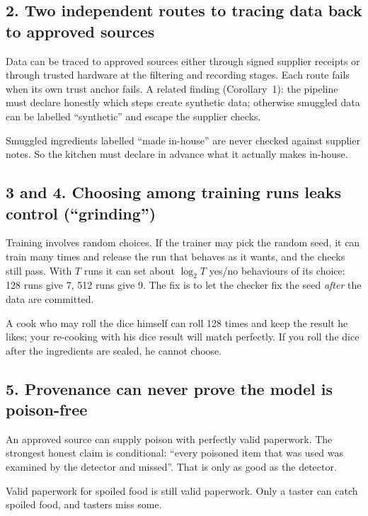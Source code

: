 \subsection*{2. Two independent routes to tracing data back to approved sources}
Data can be traced to approved sources either through signed supplier receipts or through
trusted hardware at the filtering and recording stages. Each route fails when its own trust
anchor fails. A related finding (Corollary~1): the pipeline must declare honestly which steps
create synthetic data; otherwise smuggled data can be labelled ``synthetic'' and escape the
supplier checks.
\begin{analogy}
Smuggled ingredients labelled ``made in-house'' are never checked against supplier notes. So
the kitchen must declare in advance what it actually makes in-house.
\end{analogy}

\subsection*{3 and 4. Choosing among training runs leaks control (``grinding'')}
Training involves random choices. If the trainer may pick the random seed, it can train many
times and release the run that behaves as it wants, and the checks still pass. With $T$ runs it
can set about $\log_2 T$ yes/no behaviours of its choice: 128 runs give 7, 512 runs give 9.
The fix is to let the checker fix the seed \emph{after} the data are committed.
\begin{analogy}
A cook who may roll the dice himself can roll 128 times and keep the result he likes; your
re-cooking with his dice result will match perfectly. If you roll the dice after the
ingredients are sealed, he cannot choose.
\end{analogy}

\subsection*{5. Provenance can never prove the model is poison-free}
An approved source can supply poison with perfectly valid paperwork. The strongest honest claim
is conditional: ``every poisoned item that was used was examined by the detector and missed''.
That is only as good as the detector.
\begin{analogy}
Valid paperwork for spoiled food is still valid paperwork. Only a taster can catch spoiled
food, and tasters miss some.
\end{analogy}

